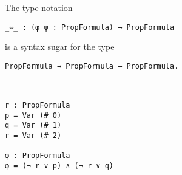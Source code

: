 \documentclass[../main.tex]{subfiles}
\begin{document}
\begin{remark}
The type notation
\begin{verbatim}
_⇔_ : (φ ψ : PropFormula) → PropFormula
\end{verbatim}
is a syntax sugar for the type
\begin{verbatim}
PropFormula → PropFormula → PropFormula.
\end{verbatim}
\end{remark}

\begin{example}
\hspace*{5cm}\\[3mm]
\begin{verbatim}
r : PropFormula
p = Var (# 0)
q = Var (# 1)
r = Var (# 2)

φ : PropFormula
φ = (¬ r ∨ p) ∧ (¬ r ∨ q)
\end{verbatim}
\end{example}
\end{document}
